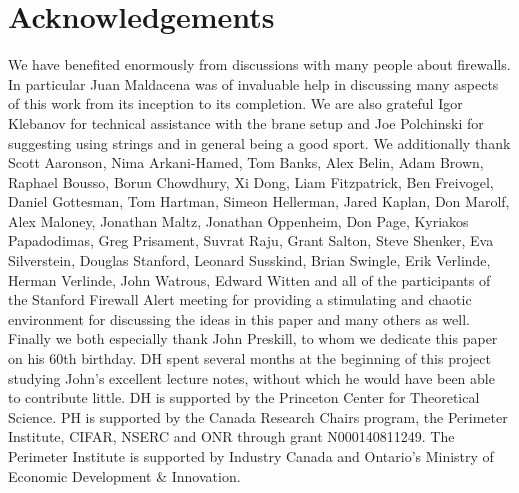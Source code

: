 \documentclass[12pt]{article}
\newcommand{\textcs}[1]{\textsf{#1}}
\newcommand{\NP}{\textcs{NP}}
\begin{document}
\section*{Acknowledgements}
We have benefited enormously from discussions with many people about firewalls.  In particular Juan Maldacena was of invaluable help in discussing many aspects of this work from its inception to its completion.  We are also grateful Igor Klebanov for technical assistance with the brane setup and Joe Polchinski for suggesting using strings and in general being a good sport.  We additionally thank Scott Aaronson, Nima Arkani-Hamed, Tom Banks, Alex Belin, Adam Brown, Raphael Bousso, Borun Chowdhury, Xi Dong, Liam Fitzpatrick, Ben Freivogel, Daniel Gottesman, Tom Hartman, Simeon Hellerman, Jared Kaplan, Don Marolf, Alex Maloney, Jonathan Maltz, Jonathan Oppenheim, Don Page, Kyriakos Papadodimas, Greg Prisament, Suvrat Raju, Grant Salton, Steve Shenker, Eva Silverstein, Douglas Stanford, Leonard Susskind, Brian Swingle, Erik Verlinde, Herman Verlinde, John Watrous, Edward Witten and all of the participants of the Stanford Firewall Alert meeting for providing a stimulating and chaotic environment for discussing the ideas in this paper and many others as well.  Finally we both especially thank John Preskill, to whom we dedicate this paper on his 60th birthday.  DH spent several months at the beginning of this project studying John's excellent lecture notes, without which he would have been able to contribute little.  DH is supported by the Princeton Center for Theoretical Science. PH is supported by the Canada Research Chairs program, the Perimeter Institute, CIFAR, NSERC and ONR through grant N000140811249. The Perimeter Institute is supported by Industry Canada and Ontario's Ministry of Economic Development \& Innovation.
\appendix
%
\end{document}

